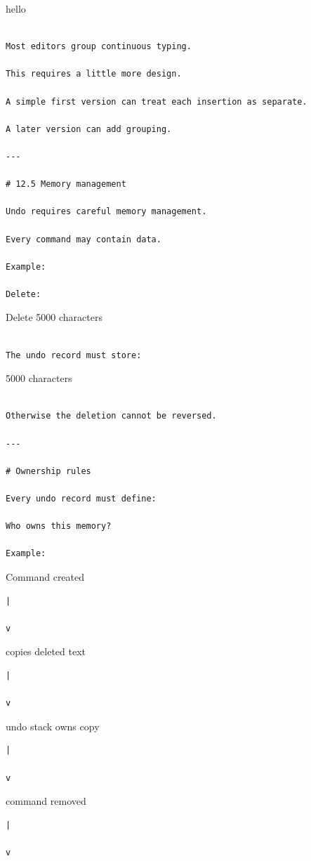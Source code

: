 \documentclass[
  oneside,
  openany]{book}
\begin{document}
hello

\begin{verbatim}

Most editors group continuous typing.

This requires a little more design.

A simple first version can treat each insertion as separate.

A later version can add grouping.

---

# 12.5 Memory management

Undo requires careful memory management.

Every command may contain data.

Example:

Delete:
\end{verbatim}

Delete 5000 characters

\begin{verbatim}

The undo record must store:
\end{verbatim}

5000 characters

\begin{verbatim}

Otherwise the deletion cannot be reversed.

---

# Ownership rules

Every undo record must define:

Who owns this memory?

Example:
\end{verbatim}

Command created

\begin{verbatim}
|

v
\end{verbatim}

copies deleted text

\begin{verbatim}
|

v
\end{verbatim}

undo stack owns copy

\begin{verbatim}
|

v
\end{verbatim}

command removed

\begin{verbatim}
|

v
\end{verbatim}
\end{document}
